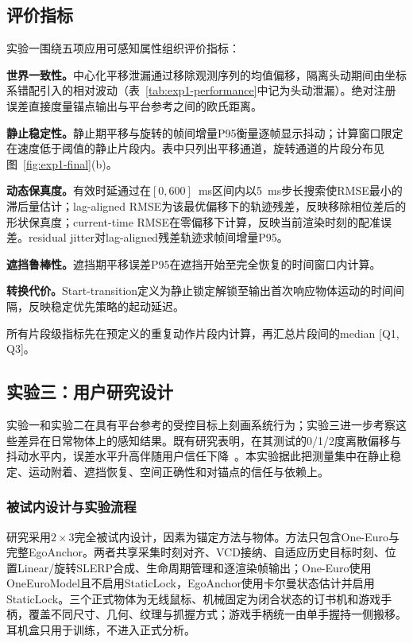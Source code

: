 \documentclass[review]{vgtc}
\begin{document}
\subsection{评价指标}

实验一围绕五项应用可感知属性组织评价指标：

\textbf{世界一致性。}中心化平移泄漏通过移除观测序列的均值偏移，隔离头动期间由坐标系错配引入的相对波动（表~\ref{tab:exp1-performance}中记为头动泄漏）。绝对注册误差直接度量锚点输出与平台参考之间的欧氏距离。

\textbf{静止稳定性。}静止期平移与旋转的帧间增量P95衡量逐帧显示抖动；计算窗口限定在速度低于阈值的静止片段内。表中只列出平移通道，旋转通道的片段分布见图~\ref{fig:exp1-final}(b)。

\textbf{动态保真度。}有效时延通过在$[0, 600]$~ms区间内以5~ms步长搜索使RMSE最小的滞后量估计；lag-aligned RMSE为该最优偏移下的轨迹残差，反映移除相位差后的形状保真度；current-time RMSE在零偏移下计算，反映当前渲染时刻的配准误差。residual jitter对lag-aligned残差轨迹求帧间增量P95。

\textbf{遮挡鲁棒性。}遮挡期平移误差P95在遮挡开始至完全恢复的时间窗口内计算。

\textbf{转换代价。}Start-transition定义为静止锁定解锁至输出首次响应物体运动的时间间隔，反映稳定优先策略的起动延迟。

所有片段级指标先在预定义的重复动作片段内计算，再汇总片段间的median [Q1, Q3]。

\subsection{实验三：用户研究设计}\label{sec:exp3-design}

实验一和实验二在具有平台参考的受控目标上刻画系统行为；实验三进一步考察这些差异在日常物体上的感知结果。既有研究表明，在其测试的0/1/2度离散偏移与抖动水平内，误差水平升高伴随用户信任下降~\cite{gottsacker2024artrust}。本实验据此把测量集中在静止稳定、运动附着、遮挡恢复、空间正确性和对锚点的信任与依赖上。

\subsubsection{被试内设计与实验流程}

研究采用$2 \times 3$完全被试内设计，因素为锚定方法与物体。方法只包含One-Euro与完整EgoAnchor。两者共享采集时刻对齐、VCD接纳、自适应历史目标时刻、位置Linear/旋转SLERP合成、生命周期管理和逐渲染帧输出；One-Euro使用OneEuroModel且不启用StaticLock，EgoAnchor使用卡尔曼状态估计并启用StaticLock。三个正式物体为无线鼠标、机械固定为闭合状态的订书机和游戏手柄，覆盖不同尺寸、几何、纹理与抓握方式；游戏手柄统一由单手握持一侧搬移。耳机盒只用于训练，不进入正式分析。
\end{document}
